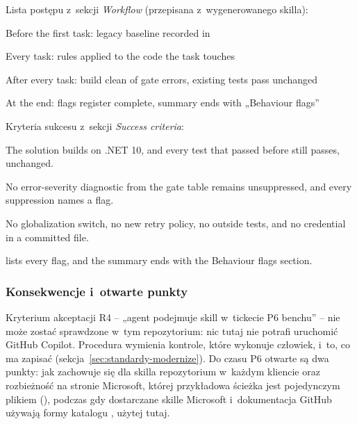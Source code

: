 Lista postępu z~sekcji \emph{Workflow} (przepisana z~wygenerowanego skilla):

\begin{checklista}
  \item Before the first task: legacy baseline recorded in 
  \item Every task: rules applied to the code the task touches
  \item After every task: build clean of gate errors, existing tests pass unchanged
  \item At the end: flags register complete, summary ends with „Behaviour flags”
\end{checklista}

Kryteria sukcesu z~sekcji \emph{Success criteria}:

\begin{checklista}
  \item The solution builds on .NET 10, and every test that passed before still passes, unchanged.
  \item No error-severity diagnostic from the gate table remains unsuppressed, and every
        suppression names a flag.
  \item No globalization switch, no new retry policy, no  outside tests,
        and no credential in a committed file.
  \item {} lists every flag, and the summary ends with the
        Behaviour flags section.
\end{checklista}

\subsubsection{Konsekwencje i~otwarte punkty}

Kryterium akceptacji R4 -- „agent podejmuje skill w~tickecie P6 benchu” -- nie może zostać
sprawdzone w~tym repozytorium: nic tutaj nie potrafi uruchomić GitHub Copilot. Procedura
wymienia kontrole, które wykonuje człowiek, i~to, co ma zapisać
(sekcja~\ref{sec:standardy-modernize}). Do czasu P6 otwarte są dwa punkty: jak
 zachowuje się dla skilla repozytorium w~każdym kliencie oraz rozbieżność
na stronie Microsoft, której przykładowa ścieżka jest pojedynczym plikiem
(), podczas gdy dostarczane skille Microsoft i~dokumentacja
GitHub używają formy katalogu , użytej tutaj.

